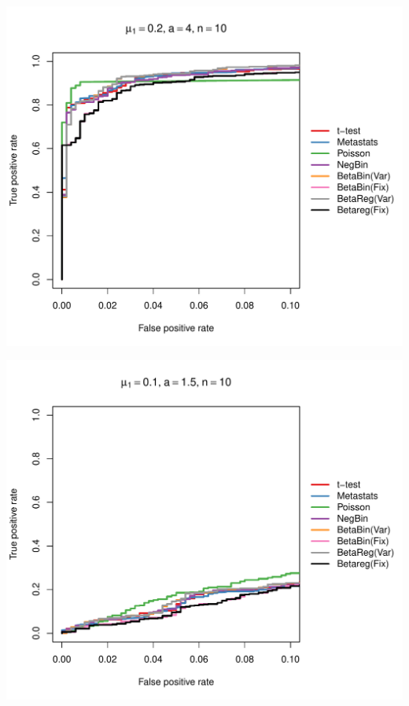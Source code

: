 \documentclass[12pt]{article}\usepackage{graphicx, color}
\makeatletter
\def\maxwidth{ %
  \ifdim\Gin@nat@width>\linewidth
    \linewidth
  \else
    \Gin@nat@width
  \fi
}
\newenvironment{knitrout}{}{} %
\makeatother
\begin{document}
\begin{knitrout}
{\centering \includegraphics[width=\maxwidth]{figure/rocs51} 

}




{\centering \includegraphics[width=\maxwidth]{figure/rocs52} 

}





\end{knitrout}
\end{document}
